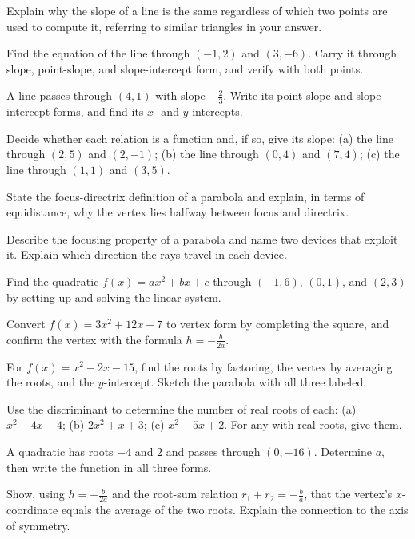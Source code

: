\documentclass[12pt]{book}
\begin{document}
\begin{exercises}
\item Explain why the slope of a line is the same regardless of which two points are
used to compute it, referring to similar triangles in your answer.

\item Find the equation of the line through $(-1,2)$ and $(3,-6)$. Carry it through
slope, point-slope, and slope-intercept form, and verify with both points.

\item A line passes through $(4,1)$ with slope $-\tfrac23$. Write its point-slope and
slope-intercept forms, and find its $x$- and $y$-intercepts.

\item Decide whether each relation is a function and, if so, give its slope:
(a) the line through $(2,5)$ and $(2,-1)$; (b) the line through $(0,4)$ and $(7,4)$;
(c) the line through $(1,1)$ and $(3,5)$.

\item State the focus-directrix definition of a parabola and explain, in terms of
equidistance, why the vertex lies halfway between focus and directrix.

\item Describe the focusing property of a parabola and name two devices that exploit
it. Explain which direction the rays travel in each device.

\item Find the quadratic $f(x)=ax^2+bx+c$ through $(-1,6)$, $(0,1)$, and $(2,3)$ by
setting up and solving the linear system.

\item Convert $f(x)=3x^2+12x+7$ to vertex form by completing the square, and confirm
the vertex with the formula $h=-\tfrac{b}{2a}$.

\item For $f(x)=x^2-2x-15$, find the roots by factoring, the vertex by averaging the
roots, and the $y$-intercept. Sketch the parabola with all three labeled.

\item Use the discriminant to determine the number of real roots of each:
(a) $x^2-4x+4$; (b) $2x^2+x+3$; (c) $x^2-5x+2$. For any with real roots, give them.

\item A quadratic has roots $-4$ and $2$ and passes through $(0,-16)$. Determine $a$,
then write the function in all three forms.

\item Show, using $h=-\tfrac{b}{2a}$ and the root-sum relation $r_1+r_2=-\tfrac{b}{a}$,
that the vertex's $x$-coordinate equals the average of the two roots. Explain the
connection to the axis of symmetry.
\end{exercises}
\end{document}
